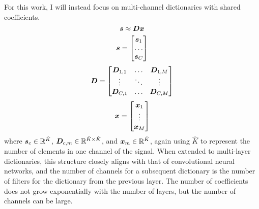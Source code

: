 For this work, I will instead focus on multi-channel dictionaries with shared coefficients.
%
\begin{equation}
\bm{s} \approx \bm{D}\bm{x}
\end{equation}
\begin{equation}
\bm{s} = \begin{bmatrix} \bm{s}_1 \\ \hdots \\ \bm{s}_C \end{bmatrix}
\end{equation}
\begin{equation}
\bm{D} = \begin{bmatrix} \bm{D}_{1,1} & \hdots & \bm{D}_{1,M}  \\ \vdots & \ddots & \vdots \\ \bm{D}_{C,1} & \hdots & \bm{D}_{C,M} \end{bmatrix}
\end{equation}
\begin{equation}
\bm{x} = \begin{bmatrix} \bm{x}_1 \\ \vdots \\ \bm{x}_M \end{bmatrix}
\end{equation}
where $\bm{s}_c \in \mathbb{R}^{\hat{K}}$, $\bm{D}_{c,m} \in \mathbb{R}^{\hat{K} \times \hat{K}}$, and $\bm{x}_{m} \in \mathbb{R}^{\hat{K}}$, again using $\hat{K}$ to represent the number of elements in one channel of the signal.
%
When extended to multi-layer dictionaries, this structure closely aligns with that of convolutional neural networks,  and the number of channels for a subsequent dictionary is the number of filters for the dictionary from the previous layer. The number of coefficients does not grow exponentially with the number of layers, but the number of channels can be large.



